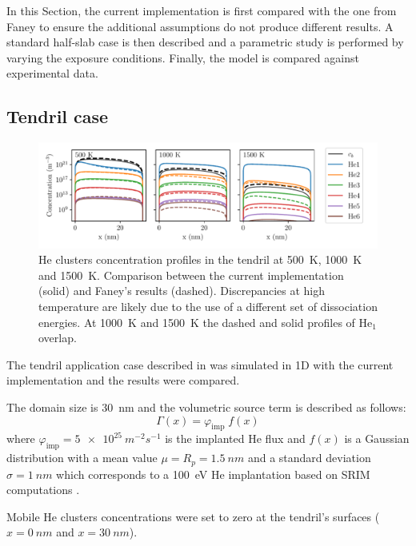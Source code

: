 In this Section, the current implementation is first compared with the one from Faney  to ensure the additional assumptions do not produce different results.
A standard half-slab case is then described and a parametric study is performed by varying the exposure conditions.
Finally, the model is compared against experimental data.

\subsection{Tendril case} 

\begin{figure}
    \centering
    \includegraphics[width=\linewidth]{Figures/Chapter4/profiles_tendrils.pdf}
    \caption{He clusters concentration profiles in the \gls{tendril} at \SI{500}{K}, \SI{1000}{K} and \SI{1500}{K}. Comparison between the current implementation (solid) and Faney's results \cite{faney_spatially_2015} (dashed).  Discrepancies at high temperature are likely due to the use of a different set of dissociation energies. At \SI{1000}{K} and \SI{1500}{K} the dashed and solid profiles of He$_1$ overlap.}
\end{figure}

The \gls{tendril} application case described in \cite{faney_spatially_2015} was simulated in 1D with the current implementation and the results were compared.

The domain size is \SI{30}{nm} and the volumetric source term is described as follows:
\begin{equation}
    \Gamma(x) = \varphi_\mathrm{imp} \; f(x) 
\end{equation}
where $\varphi_\mathrm{imp} = \SI{5e25}{m^{-2} s^{-1}}$ is the implanted He flux and $f(x)$ is a Gaussian distribution with a mean value $\mu = R_p = \SI{1.5}{nm}$ and a standard deviation $\sigma = \SI{1}{nm}$ which corresponds to a \SI{100}{eV} He implantation based on SRIM computations .

Mobile He clusters concentrations were set to zero at the \gls{tendril}'s surfaces ($x=\SI{0}{nm}$ and $x=\SI{30}{nm}$).

